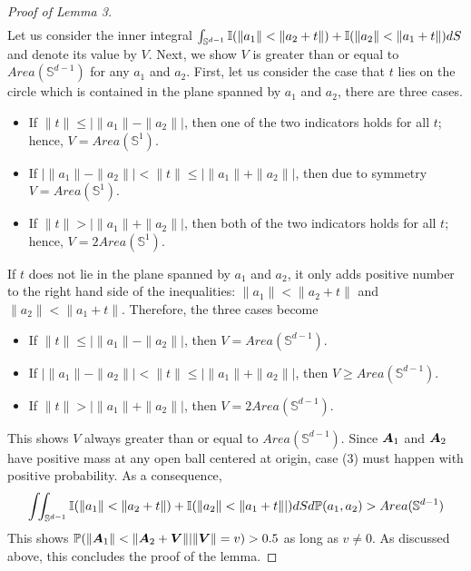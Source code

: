 \documentclass{article}
\begin{document}
\begin{proof}[Proof of Lemma 3]
\begin{eqnarray*}
	\end{eqnarray*}
	Let us consider the inner integral $\int_{\mathbb{S}^{d-1}}\mathbb{I}(\| a_1 \| < \|a_2+t\|) + \mathbb{I}(\| a_2 \| < \|a_1+t\|) dS$ and denote its value by $V$. Next, we show $V$ is greater than or equal to $Area(\mathbb{S}^{d-1})$ for any $a_1$ and $a_2$. First, let us consider the case that 
	$t$ lies on the circle which is contained in the plane spanned by $a_1$ and $a_2$, there are three cases.
	\begin{itemize}
		\item[Case (1): ] If $\|t\| \leq |\|a_1\| - \|a_2\||$, then one of the two indicators holds for all $t$; hence, $V = Area(\mathbb{S}^{1})$.
		\item[Case (2): ] If $ |\|a_1\| - \|a_2\|| < \|t\| \leq |\|a_1\| + \|a_2\||$, then due to symmetry $V = Area(\mathbb{S}^{1})$.
		\item[Case (3): ] If $\|t\| > |\|a_1\| + \|a_2\||$, then both of the two indicators holds for all $t$; hence, $V =2 Area(\mathbb{S}^{1})$.
	\end{itemize}
	If $t$ does not lie  in the plane spanned by $a_1$ and $a_2$, it only adds positive number to the right hand side of the inequalities: $\| a_1 \| < \|a_2+t\|$ and $\| a_2 \| < \|a_1+t\|$. Therefore, the three cases become
	\begin{itemize}
		\item[Case (1): ] If $\|t\| \leq |\|a_1\| - \|a_2\||$, then $V = Area(\mathbb{S}^{d-1})$.
		\item[Case (2): ] If $|\|a_1\| - \|a_2\|| < \|t\| \leq |\|a_1\| + \|a_2\||$, then $V \geq Area(\mathbb{S}^{d-1})$.
		\item[Case (3): ] If $\|t\| > |\|a_1\| + \|a_2\||$, then $V =2 Area(\mathbb{S}^{d-1})$.
	\end{itemize}
	This shows $V$ always greater than or equal to  $Area(\mathbb{S}^{d-1})$. Since $\boldsymbol{A}_1$ and $\boldsymbol{A}_2$ have positive mass at any open ball centered at origin, case (3) must happen with positive probability. As a consequence, 
	\[\int_{} \int_{\mathbb{S}^{d-1}}\mathbb{I}(\| a_1 \| < \|a_2+t\|) + \mathbb{I}(\| a_2 \| < \|a_1+t\||) dS d\mathbb{P}(a_1,a_2) >Area(\mathbb{S}^{d-1}) \]
	This shows $\mathbb{P}(\| \boldsymbol{A}_1 \| < \|\boldsymbol{A}_2+\boldsymbol{V}\||\|\boldsymbol{V} \|=v) > 0.5$ as long as $v \neq 0$. As discussed above, this concludes the proof of the lemma.
\end{proof}
\end{document}
